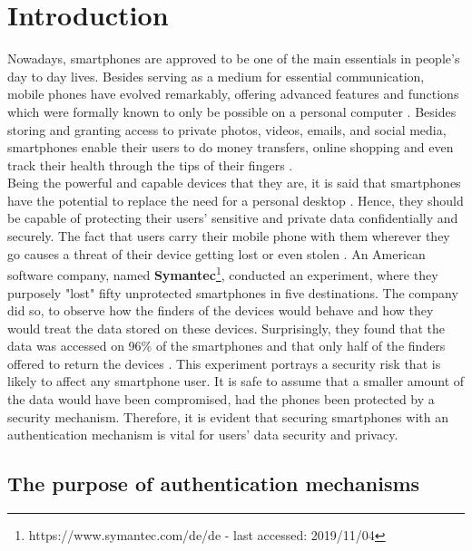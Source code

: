 \chapter{Introduction}\label{ch:first}

Nowadays, smartphones are approved to be one of the main essentials in people's day to day lives. Besides serving as a medium for essential communication, mobile phones have evolved remarkably, offering advanced features and functions which were formally known to only be possible on a personal computer \cite{Alsaleh}. Besides storing and granting access to private photos, videos, emails, and social media, smartphones enable their users to do money transfers, online shopping and even track their health through the tips of their fingers \cite{Egelman:2014:YRL:2660267.2660273,Albayram:2017:BUL:3235924.3235929,Schloeglhofer}. \\

Being the powerful and capable devices that they are, it is said that smartphones have the potential to replace the need for a personal desktop \cite{Alsaleh}. Hence, they should be capable of protecting their users' sensitive and private data confidentially and securely. The fact that users carry their mobile phone with them wherever they go causes a threat of their device getting lost or even stolen \cite{Egelman:2014:YRL:2660267.2660273}. An American software company, named \textbf{Symantec}\footnote{https://www.symantec.com/de/de - last accessed: 2019/11/04}, conducted an experiment, where they purposely "lost" fifty unprotected smartphones in five destinations. The company did so, to observe how the finders of the devices would behave and how they would treat the data stored on these devices. Surprisingly, they found that the data was accessed on 96\% of the smartphones and that only half of the finders offered to return the devices \cite{symantec}.  This experiment portrays a security risk that is likely to affect any smartphone user.  It is safe to assume that a smaller amount of the data would have been compromised, had the phones been protected by a security mechanism. Therefore, it is evident that securing smartphones with an authentication mechanism is vital for users' data security and privacy.

\section{The purpose of authentication mechanisms}


